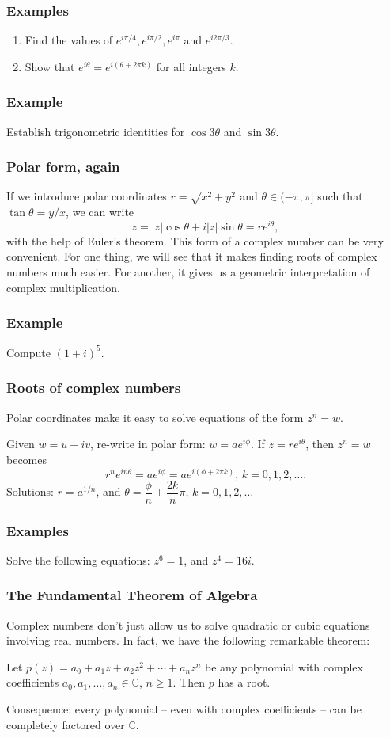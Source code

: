 \documentclass[11pt,t]{beamer}
\newcommand{\C}{\mathbb{C}}
\newcommand{\abs}[1]{\lvert #1\rvert}
\begin{document}
\begin{frame}
\frametitle{Examples}
\begin{enumerate}
\item Find the values of $e^{i\pi/4}, e^{i\pi/2}, e^{i\pi}$ and $e^{i2\pi/3}$.

\vspace{1.5in}

\item Show that $e^{i\theta} = e^{i(\theta+2\pi k)}$ for all integers $k$.
\end{enumerate}
\end{frame}
\begin{frame}
\frametitle{Example}

Establish trigonometric identities for $\cos 3\theta$ and $\sin 3\theta$.

\end{frame}
\begin{frame}
\frametitle{Polar form, again}
If we introduce polar coordinates $r = \sqrt{x^2+y^2}$ and $\theta\in (-\pi,\pi]$ such that $\tan\theta = y/x$, we can write
\[
z = \abs{z}\cos\theta+i\abs{z}\sin\theta = re^{i\theta},
\]
with the help of Euler's theorem. This form of a complex number can be very convenient. For one thing, we will see that it makes finding roots of complex numbers much easier. For another, it gives us a geometric interpretation of complex multiplication.
\end{frame}
\begin{frame}
\frametitle{Example}

Compute $(1+i)^5$.
\end{frame}
\begin{frame}
\frametitle{Roots of complex numbers}

Polar coordinates make it easy to solve equations of the form $z^n=w$.

Given $w=u+iv$, re-write in polar form: $w = ae^{i\phi}$. If $z=re^{i\theta}$, then $z^n=w$ becomes
\[
r^ne^{in\theta} = ae^{i\phi} = ae^{i(\phi+2\pi k)}, \, k=0,1,2,\ldots.
\]
Solutions: $r = a^{1/n}$, and $\theta = \dfrac{\phi}{n}+\dfrac{2k}{n}\pi$, $k=0,1,2,\ldots$
\end{frame}
\begin{frame}
\frametitle{Examples}

Solve the following equations: $z^6=1$, and $z^4=16i$.
\end{frame}
\begin{frame}
\frametitle{The Fundamental Theorem of Algebra}
Complex numbers don't just allow us to solve quadratic or cubic equations involving real numbers. In fact, we have the following remarkable theorem:
\begin{theorem}
Let $p(z) = a_0+a_1z+a_2z^2+\cdots + a_nz^n$ be any polynomial with complex coefficients $a_0,a_1,\ldots, a_n\in\C$, $n\geq 1$. Then $p$ has a root.
\end{theorem}
Consequence: every polynomial -- even with complex coefficients -- can be \alert{completely factored} over $\C$.
\end{frame}
\end{document}
